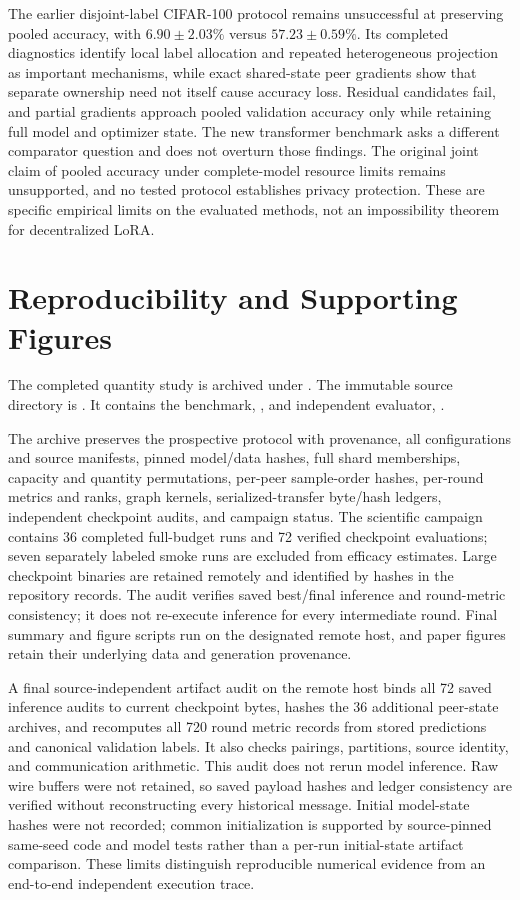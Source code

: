 \documentclass[11pt]{article}
\begin{document}
The earlier disjoint-label CIFAR-100 protocol remains unsuccessful at preserving pooled accuracy, with $6.90\pm2.03\%$ versus $57.23\pm0.59\%$. Its completed diagnostics identify local label allocation and repeated heterogeneous projection as important mechanisms, while exact shared-state peer gradients show that separate ownership need not itself cause accuracy loss. Residual candidates fail, and partial gradients approach pooled validation accuracy only while retaining full model and optimizer state. The new transformer benchmark asks a different comparator question and does not overturn those findings. The original joint claim of pooled accuracy under complete-model resource limits remains unsupported, and no tested protocol establishes privacy protection. These are specific empirical limits on the evaluated methods, not an impossibility theorem for decentralized LoRA.

\appendix
\section{Reproducibility and Supporting Figures}
The completed quantity study is archived under . The immutable source directory is . It contains the benchmark, , and independent evaluator, .

The archive preserves the prospective protocol with provenance, all configurations and source manifests, pinned model/data hashes, full shard memberships, capacity and quantity permutations, per-peer sample-order hashes, per-round metrics and ranks, graph kernels, serialized-transfer byte/hash ledgers, independent checkpoint audits, and campaign status. The scientific campaign contains 36 completed full-budget runs and 72 verified checkpoint evaluations; seven separately labeled smoke runs are excluded from efficacy estimates. Large checkpoint binaries are retained remotely and identified by hashes in the repository records. The audit verifies saved best/final inference and round-metric consistency; it does not re-execute inference for every intermediate round. Final summary and figure scripts run on the designated remote host, and paper figures retain their underlying data and generation provenance.

A final source-independent artifact audit on the remote host binds all 72 saved inference audits to current checkpoint bytes, hashes the 36 additional peer-state archives, and recomputes all 720 round metric records from stored predictions and canonical validation labels. It also checks pairings, partitions, source identity, and communication arithmetic. This audit does not rerun model inference. Raw wire buffers were not retained, so saved payload hashes and ledger consistency are verified without reconstructing every historical message. Initial model-state hashes were not recorded; common initialization is supported by source-pinned same-seed code and model tests rather than a per-run initial-state artifact comparison. These limits distinguish reproducible numerical evidence from an end-to-end independent execution trace.
\end{document}
